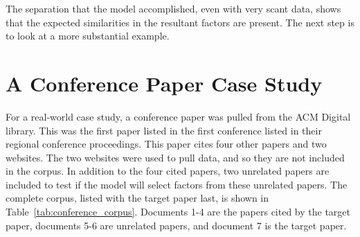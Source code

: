 \documentclass[../ut-dissertation.tex]{subfiles}
\begin{document}
The separation that the model accomplished, even with very scant data,
shows that the expected similarities in the resultant factors are
present.  The next step is to look at a more substantial example.
\FloatBarrier

\section{A Conference Paper Case Study}
For a real-world case study, a conference paper was pulled from the
ACM Digital library.  This was the first paper listed in the first
conference listed in their regional conference proceedings.  This
paper cites four other papers and two websites.  The two websites were
used to pull data, and so they are not included in the corpus.  In
addition to the four cited papers, two unrelated papers are included
to test if the model will select factors from these unrelated papers.
The complete corpus, listed with the target paper last, is shown in
Table~\ref{tab:conference_corpus}. Documents 1-4 are the papers cited
by the target paper, documents 5-6 are unrelated papers, and document
7 is the target paper.
\end{document}
